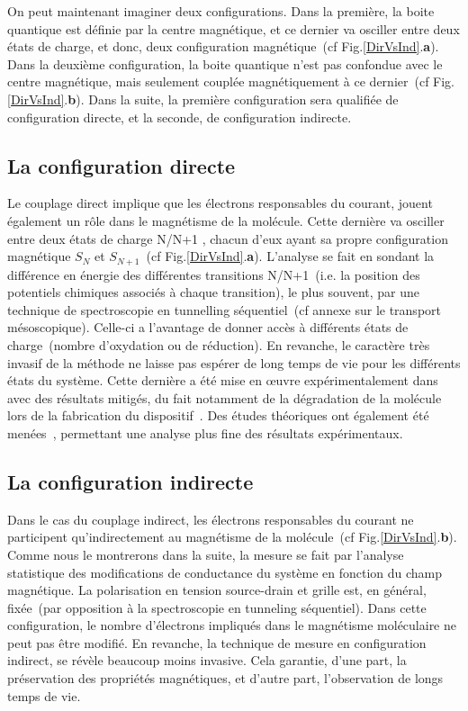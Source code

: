 On peut maintenant imaginer deux configurations. Dans la première, la boite quantique est définie par la centre magnétique, et ce dernier va osciller entre deux états de charge, et donc, deux configuration magnétique~(cf Fig.\ref{DirVsInd}.\textbf{a}). 
Dans la deuxième configuration, la boite quantique n'est pas confondue avec le centre magnétique, mais seulement couplée magnétiquement à ce dernier~(cf Fig.\ref{DirVsInd}.\textbf{b}). Dans la suite, la première configuration sera qualifiée de configuration directe, et la seconde, de configuration indirecte.


\subsection{La configuration directe}
Le couplage direct implique que les électrons responsables du courant, jouent également un rôle dans le magnétisme de la molécule. Cette dernière va osciller entre deux états de charge N/N+1 , chacun d'eux ayant sa propre configuration magnétique $S_N$ et $S_{N+1}$~(cf Fig.\ref{DirVsInd}.\textbf{a}). L'analyse se fait en sondant la différence en énergie des différentes transitions N/N+1~(i.e. la position des potentiels chimiques associés à chaque transition), le plus souvent, par une technique de spectroscopie en tunnelling séquentiel~(cf annexe sur le transport mésoscopique). Celle-ci a l'avantage de donner accès à différents états de charge~(nombre d'oxydation ou de réduction). En revanche, le caractère très invasif de la méthode ne laisse pas espérer de long temps de vie pour les différents états du système. Cette dernière a été mise en œuvre expérimentalement dans \cite{Heersche2006,Jo2006,Zyazin2010} avec des résultats mitigés, du fait notamment de la dégradation de la molécule lors de la fabrication du dispositif~\cite{Jo2006}. Des études théoriques ont également été menées~\cite{Timm2006,Timm2007}, permettant une analyse plus fine des résultats expérimentaux.

\subsection{La configuration indirecte}

Dans le cas du couplage indirect, les électrons responsables du courant ne participent qu'indirectement au magnétisme de la molécule~(cf Fig.\ref{DirVsInd}.\textbf{b}). Comme nous le montrerons dans la suite, la mesure se fait par l'analyse statistique des modifications de conductance du système en fonction du champ magnétique. La polarisation en tension source-drain et grille est, en général, fixée~(par opposition à la spectroscopie en tunneling séquentiel). Dans cette configuration, le nombre d'électrons impliqués dans le magnétisme moléculaire ne peut pas être modifié. En revanche, la technique de mesure en configuration indirect, se révèle beaucoup moins invasive. Cela garantie, d'une part, la préservation des propriétés magnétiques, et d'autre part, l'observation de longs temps de vie. 

